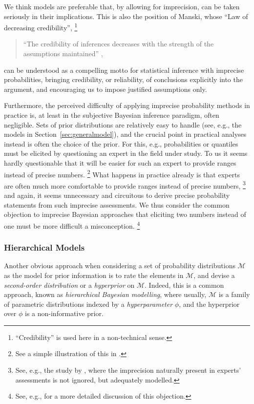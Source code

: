 We think models are preferable that, by allowing for imprecision, can be taken seriously in their implications.
This is also the position of Manski, whose ``Law of decreasing credibility'',%
\footnote{``Credibility'' is used here in a non-technical sense.}
\begin{quote}
``The credibility of inferences decreases with the strength of the assumptions maintained'' \parencite[p. 1]{2003:manski},
\end{quote}
can be understood as a compelling motto for statistical inference with imprecise probabilities,
bringing credibility, or reliability, of conclusions explicitly into the argument,
and encouraging us to impose justified assumptions only.

Furthermore, the perceived difficulty of applying imprecise probability methods in practice
is, at least in the subjective Bayesian inference paradigm, often negligible.
Sets of prior distributions are relatively easy to handle (see, e.g., the models in Section~\ref{sec:generalmodel}),
and the crucial point in practical analyses instead is often the choice of the prior.
For this, e.g., probabilities or quantiles must be elicited
by questioning an expert in the field under study.
To us it seems hardly questionable that it will be easier for such an expert
to provide ranges instead of precise numbers.%
\footnote{See a simple illustration of this in \textcite[\S 5.8, footnote~7, p.~535]{1991:walley}.}
What happens in practice already is that experts are often much more comfortable to provide ranges instead of precise numbers,%
\footnote{See, e.g., the study by \textcite{2011:rinderknecht},
where the imprecision naturally present in experts' assessments is not ignored,
but adequately modelled.}
and again, it seems unnecessary and circuitous to derive precise probability statements
from such imprecise assessments.
We thus consider the common objection to imprecise Bayesian approaches
that eliciting two numbers instead of one must be more difficult a misconception.%
\footnote{See, e.g., \textcite[\S 5.8.2]{1991:walley} for a more detailed discussion of this objection.}

\subsubsection{Hierarchical Models}
\label{sec:hierarchical}

Another obvious approach when considering a set of probability distributions $\mathcal{M}$
as the model for prior information is to rate the elements in $\mathcal{M}$,
and devise a \emph{second-order distribution} or a \emph{hyperprior} on $\mathcal{M}$.
Indeed, this is a common approach, known as \emph{hierarchical Bayesian modelling},
where usually, $\mathcal{M}$ is a family of parametric distributions indexed
by a \emph{hyperparameter} $\phi$, and the hyperprior over $\phi$ is a non-informative prior.

